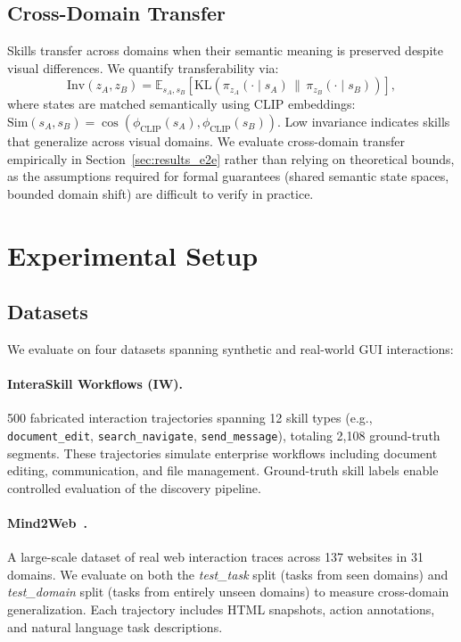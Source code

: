 \documentclass{article}
\begin{document}
\subsection{Cross-Domain Transfer}

Skills transfer across domains when their semantic meaning is preserved despite visual differences. We quantify transferability via:
\begin{equation}
\text{Inv}(z_A, z_B) = \mathbb{E}_{s_A, s_B} \left[\text{KL}(\pi_{z_A}(\cdot \mid s_A) \,\|\, \pi_{z_B}(\cdot \mid s_B))\right],
\end{equation}
where states are matched semantically using CLIP embeddings: $\text{Sim}(s_A, s_B) = \cos(\phi_{\text{CLIP}}(s_A), \phi_{\text{CLIP}}(s_B))$. Low invariance indicates skills that generalize across visual domains. We evaluate cross-domain transfer empirically in Section~\ref{sec:results_e2e} rather than relying on theoretical bounds, as the assumptions required for formal guarantees (shared semantic state spaces, bounded domain shift) are difficult to verify in practice.

\section{Experimental Setup}
\label{sec:setup}

\subsection{Datasets}

We evaluate on four datasets spanning synthetic and real-world GUI interactions:

\paragraph{InteraSkill Workflows (IW).} 500 fabricated interaction trajectories spanning 12 skill types (e.g., \texttt{document\_edit}, \texttt{search\_navigate}, \texttt{send\_message}), totaling 2,108 ground-truth segments. These trajectories simulate enterprise workflows including document editing, communication, and file management. Ground-truth skill labels enable controlled evaluation of the discovery pipeline.

\paragraph{Mind2Web~\cite{deng2023mind2web}.} A large-scale dataset of real web interaction traces across 137 websites in 31 domains. We evaluate on both the \emph{test\_task} split (tasks from seen domains) and \emph{test\_domain} split (tasks from entirely unseen domains) to measure cross-domain generalization. Each trajectory includes HTML snapshots, action annotations, and natural language task descriptions.
\end{document}
